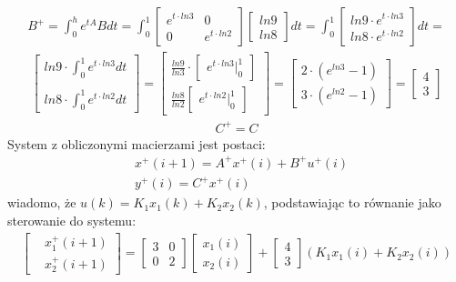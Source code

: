 \documentclass[a4paper,11pt]{article}
\begin{document}
\begin{align*}
B^{+}=\int_{0}^{h}e^{tA}Bdt=
\int_{0}^{1}
\begin{bmatrix}
e^{t\cdot ln3} & 0 \\
0 & e^{t\cdot ln2}
\end{bmatrix}
\begin{bmatrix}
ln9 \\
ln8
\end{bmatrix}
dt
=
\int_{0}^{1}
\begin{bmatrix}
ln9 \cdot e^{t\cdot ln3} \\
ln8 \cdot e^{t\cdot ln2} 
\end{bmatrix}
dt
=
\end{align*}
\begin{align*}
\begin{bmatrix}
ln9 \cdot \int_{0}^{1}e^{t\cdot ln3}dt  \\ \\
ln8 \cdot \int_{0}^{1} e^{t\cdot ln2}dt
\end{bmatrix}
=
\begin{bmatrix}
\frac{ln9}{ln3} \cdot 
\begin{bmatrix}
e^{t \cdot ln3}\Bigr|_{0}^{1}
\end{bmatrix} \\
\frac{ln8}{ln2}\begin{bmatrix}
e^{t \cdot ln2}\Bigr|_{0}^{1}
\end{bmatrix}
\end{bmatrix}=
\begin{bmatrix}
2 \cdot (e^{ln3}-1) \\
 3 \cdot ( e^{ln2}-1)
\end{bmatrix} = 
\begin{bmatrix}
4  \\
3 
\end{bmatrix}
\end{align*}
\begin{align*}
C^{+}=C
\end{align*}
System z obliczonymi macierzami jest postaci: 
\begin{align*}
&x^{+}(i+1)=A^{+}x^{+}(i)+B^{+}u^{+}(i) \\
&y^{+}(i)=C^{+}x^{+}(i)
\end{align*}
wiadomo, że \( u(k) = K_{1}x_{1}(k)+K_{2}x_{2}(k)\), podstawiając to równanie jako sterowanie do systemu:
\begin{align*}
\begin{bmatrix}
&x_{1}^{+}(i+1) \\
&x_{2}^{+}(i+1)
\end{bmatrix}
=
\begin{bmatrix}
3 & 0 \\
0 & 2
\end{bmatrix}
\begin{bmatrix}
x_{1}(i) \\
x_{2}(i)
\end{bmatrix}
+
\begin{bmatrix}
4 \\ 
3
\end{bmatrix}
(K_{1}x_{1}(i)+K_{2}x_{2}(i)) 
\end{align*}
\end{document}

